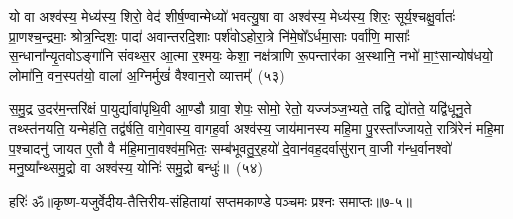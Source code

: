 यो वा अश्व॑स्य॒ मेध्य॑स्य॒ शिरो॒ वेद॑ शीर्\mbox{}ष॒ण्वान्मेध्यो॑ भवत्यु॒षा वा अश्व॑स्य॒ मेध्य॑स्य॒ शिरः॒ सूर्य॒श्चक्षु॒र्वातः॑ प्रा॒णश्च॒न्द्रमाः॒ श्रोत्र॒न्दिशः॒ पादा॑ अवान्तरदि॒शाः पर्\mbox{}श॑वो\-ऽहोरा॒त्रे नि॑मे॒षो᳚\-ऽर्धमा॒साः पर्वा॑णि॒ मासाः᳚ स॒न्धाना᳚न्यृ॒तवो\-ऽङ्गा॑नि संवथ्स॒र आ॒त्मा र॒श्मयः॒ केशा॒ नक्ष॑त्राणि रू॒पन्तार॑का अ॒स्थानि॒ नभो॑ मा॒ꣳ॒सान्योष॑धयो॒ लोमा॑नि॒ वन॒स्पत॑यो॒ वाला॑ अ॒ग्निर्मुखं॑ वैश्वान॒रो व्यात्तम्᳚~(५३)

स॒मु॒द्र उ॒दर॑म॒न्तरि॑क्षं पा॒युर्द्यावा॑\-पृथि॒वी आ॒ण्डौ ग्रावा॒ शेपः॒ सोमो॒ रेतो॒ यज्ज॑ञ्ज॒भ्यते॒ तद्वि द्यो॑तते॒ यद्वि॑धूनु॒ते तथ्स्त॑नयति॒ यन्मेह॑ति॒ तद्व॑र्\mbox{}षति॒ वागे॒वास्य॒ वागह॒र्वा अश्व॑स्य॒ जाय॑मानस्य महि॒मा पु॒रस्ता᳚ज्जायते॒ रात्रि॑रेनं महि॒मा प॒श्चादनु॑ जायत ए॒तौ वै म॑हि॒माना॒वश्व॑म॒भितः॒ सम्ब॑भूवतु॒र्॒\mbox{}हयो॑ दे॒वान॑वह॒दर्वासु॑रान् वा॒जी ग॑न्ध॒र्वानश्वो॑ मनु॒ष्या᳚न्थ्समु॒द्रो वा अश्व॑स्य॒ योनिः॑ समु॒द्रो बन्धुः॑॥~(५४)

{\anuvakamend[{व्यात्त॑मवह॒द्द्वाद॑श च}]}%

{हरिः॑ ॐ}{॥कृष्ण-यजुर्वेदीय-तैत्तिरीय-संहितायां सप्तमकाण्डे पञ्चमः प्रश्नः समाप्तः॥७-५॥}

